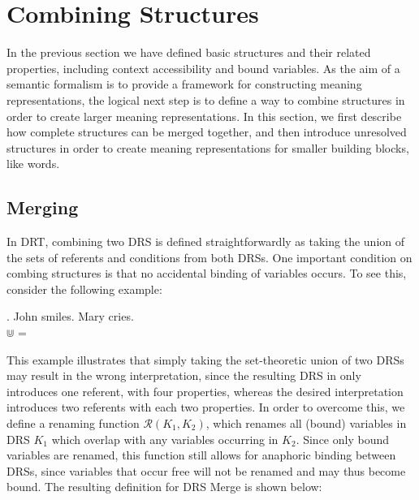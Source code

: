 \section{Combining Structures}

In the previous section we have defined basic structures and their related
properties, including context accessibility and bound variables.  As the aim
of a semantic formalism is to provide a framework for constructing meaning
representations, the logical next step is to define a way to combine
structures in order to create larger meaning representations. In this
section, we first describe how complete structures can be merged together,
and then introduce unresolved structures in order to create meaning
representations for smaller building blocks, like words.

\subsection{Merging}

In DRT, combining two DRS is defined straightforwardly as taking the union
of the sets of referents and conditions from both DRSs. One important
condition on combing structures is that no accidental binding of variables
occurs. To see this, consider the following example:

\ex. John smiles. Mary cries.\\
   $\Cup$  = 

\noindent This example illustrates that simply taking the set-theoretic
union of two DRSs may result in the wrong interpretation, since the
resulting DRS in \Last only introduces one referent, with four properties,
whereas the desired interpretation introduces two referents with each two
properties. In order to overcome this, we define a renaming function
$\mathcal{R}(K_1,K_2)$, which renames all (bound) variables in DRS $K_1$
which overlap with any variables occurring in $K_2$. %
Since only bound variables are renamed, this function still allows for
anaphoric binding between DRSs, since variables that occur free will not be
renamed and may thus become bound. The resulting definition for DRS Merge is
shown below:

